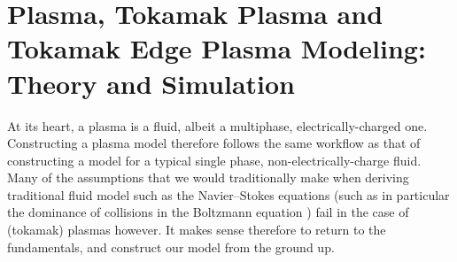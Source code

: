 \section{Plasma, Tokamak Plasma and Tokamak Edge Plasma Modeling: Theory and Simulation}

    At its heart, a plasma is a fluid, albeit a multiphase, electrically-charged one. Constructing a plasma model therefore follows the same workflow as that of constructing a model for a typical single phase, non-electrically-charge fluid. Many of the assumptions that we would traditionally make when deriving traditional fluid model such as the Navier–Stokes equations (such as in particular the dominance of collisions in the Boltzmann equation \BA{[Ref]}) fail in the case of (tokamak) plasmas however. It makes sense therefore to return to the fundamentals, and construct our model from the ground up.



    
    
    
    
